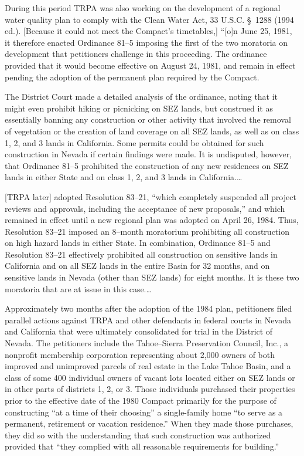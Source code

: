 During this period TRPA was also working on the development of a regional water
quality plan to comply with the Clean Water Act, 33 U.S.C. \S~1288 (1994 ed.).
[Because it could not meet the Compact's timetables,] ``[o]n June 25, 1981, it
therefore enacted Ordinance 81--5 imposing the first of the two moratoria on
development that petitioners challenge in this proceeding. The ordinance
provided that it would become effective on August 24, 1981, and remain in effect
pending the adoption of the permanent plan required by the Compact. 

The District Court made a detailed analysis of the ordinance, noting that it
might even prohibit hiking or picnicking on SEZ lands, but construed it as
essentially banning any construction or other activity that involved the removal
of vegetation or the creation of land coverage on all SEZ lands, as well as on
class 1, 2, and 3 lands in California. Some permits could be obtained for such
construction in Nevada if certain findings were made. It is undisputed, however,
that Ordinance 81--5 prohibited the construction of any new residences on SEZ
lands in either State and on class 1, 2, and 3 lands in California.\ldots

[TRPA later] adopted Resolution 83--21, ``which completely suspended all project
reviews and approvals, including the acceptance of new proposals,'' and which
remained in effect until a new regional plan was adopted on April 26, 1984.
Thus, Resolution 83--21 imposed an 8--month moratorium prohibiting all
construction on high hazard lands in either State. In combination, Ordinance
81--5 and Resolution 83--21 effectively prohibited all construction on sensitive
lands in California and on all SEZ lands in the entire Basin for 32 months, and
on sensitive lands in Nevada (other than SEZ lands) for eight months. It is
these two moratoria that are at issue in this case.\ldots



Approximately two months after the adoption of the 1984 plan, petitioners filed
parallel actions against TRPA and other defendants in federal courts in Nevada
and California that were ultimately consolidated for trial in the District of
Nevada. The petitioners include the Tahoe--Sierra Preservation Council, Inc., a
nonprofit membership corporation representing about 2,000 owners of both
improved and unimproved parcels of real estate in the Lake Tahoe Basin, and a
class of some 400 individual owners of vacant lots located either on SEZ lands
or in other parts of districts 1, 2, or 3. Those individuals purchased their
properties prior to the effective date of the 1980 Compact primarily for the
purpose of constructing ``at a time of their choosing'' a single-family home
``to serve as a permanent, retirement or vacation residence.'' When they made
those purchases, they did so with the understanding that such construction was
authorized provided that ``they complied with all reasonable requirements for
building.''

